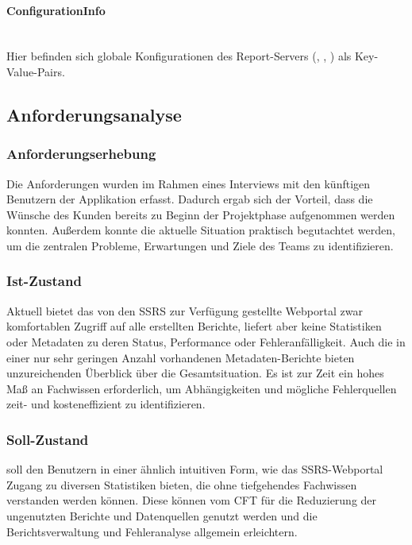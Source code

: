 \paragraph{ConfigurationInfo}~\\\label{p:ConfigurationInfo}
Hier befinden sich globale Konfigurationen des Report-Servers (, , ) als Key-Value-Pairs.


\subsection{Anforderungsanalyse}\label{sec:Anforderungsanalyse}

\subsubsection{Anforderungserhebung}\label{sec:Anforderungserhebung}
Die Anforderungen wurden im Rahmen eines Interviews mit den künftigen Benutzern der Applikation erfasst. Dadurch ergab sich der Vorteil, dass die Wünsche des Kunden bereits zu Beginn der Projektphase aufgenommen werden konnten. Außerdem konnte die aktuelle Situation praktisch begutachtet werden, um die zentralen Probleme, Erwartungen und Ziele des Teams \teamName zu identifizieren.

\subsubsection{Ist-Zustand}\label{sec:Ist}
Aktuell bietet das von den \ac{SSRS} zur Verfügung gestellte Webportal zwar komfortablen Zugriff auf alle erstellten Berichte, liefert aber keine Statistiken oder Metadaten zu deren Status, Performance oder Fehleranfälligkeit. Auch die in einer nur sehr geringen Anzahl vorhandenen Metadaten-Berichte bieten unzureichenden Überblick über die Gesamtsituation. Es ist zur Zeit ein hohes Maß an Fachwissen erforderlich, um Abhängigkeiten und mögliche Fehlerquellen zeit- und kosteneffizient zu identifizieren.

\subsubsection{Soll-Zustand}\label{sec:Soll}
\projektName soll den Benutzern in einer ähnlich intuitiven Form, wie das \ac{SSRS}-Webportal Zugang zu diversen Statistiken bieten, die ohne tiefgehendes Fachwissen verstanden werden können. Diese können vom \ac{CFT} \teamName für die Reduzierung der ungenutzten Berichte und Datenquellen genutzt werden und die Berichtsverwaltung und Fehleranalyse allgemein erleichtern.

